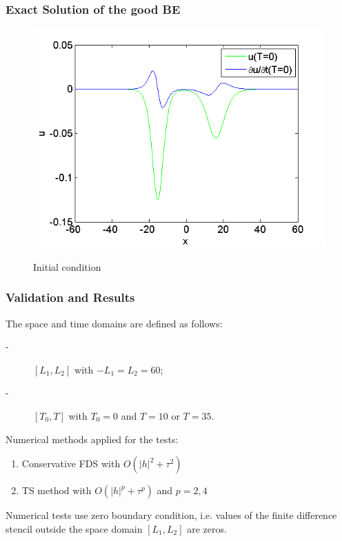 \documentclass{beamer}
\begin{document}

\begin{frame}
\frametitle{Exact Solution of the good BE}
\begin{figure}[ht]
	\centering
	\includegraphics[width=0.84\linewidth]{../IC.png}

Initial condition
\end{figure}
\end{frame}

\begin{frame}
\frametitle{Validation and Results}
The space and time domains are defined as follows:
\begin{description}
 \item[-] $[L_1,L_2]$ with $-L_1 = L_2 = 60$;
 \item[-] $[T_0,T]$ with $T_0 = 0$ and $T = 10$ or $T = 35$.
\end{description}

Numerical methods applied for the tests:
\begin{enumerate}
  \item Conservative FDS with $O(|h|^2 + \tau^2)$
  \item TS method with $O(|h|^p + \tau^p)$ and $p = 2, 4$
\end{enumerate}

Numerical tests use zero boundary condition, i.e. values of the finite difference stencil outside the space domain $[L_1,L_2]$ are zeros.
\end{frame}
\end{document}
